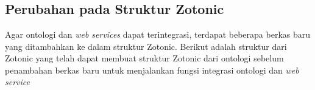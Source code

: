 \chapter{\babLima}

\section{Perubahan pada Struktur Zotonic}

Agar ontologi dan \textit{web services} dapat terintegrasi, terdapat beberapa berkas baru yang ditambahkan ke dalam struktur Zotonic. Berikut adalah struktur dari Zotonic yang telah dapat membuat struktur Zotonic dari ontologi sebelum penambahan berkas baru untuk menjalankan fungsi integrasi ontologi dan \textit{web service}\\
